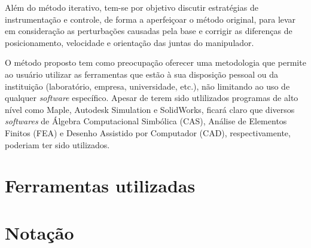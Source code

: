 Além do método iterativo, tem-se por objetivo discutir estratégias de
instrumentação e controle, de forma a aperfeiçoar o método original, para levar
em consideração as perturbações causadas pela base e corrigir as diferenças de
posicionamento, velocidade e orientação das juntas do manipulador.

O método proposto tem como preocupação oferecer uma metodologia que permite ao
usuário utilizar as ferramentas que estão à sua disposição pessoal ou da
instituição (laboratório, empresa, universidade, etc.), não limitando ao uso de
qualquer \textit{software} específico. Apesar de terem sido utlilizados
programas de alto nível como Maple, Autodesk Simulation e SolidWorks, ficará
claro que diversos \textit{softwares} de Álgebra Computacional Simbólica (CAS),
Análise de Elementos Finitos (FEA) e Desenho Assistido por Computador (CAD),
respectivamente, poderiam ter sido utilizados.


\section{Ferramentas utilizadas}

\section{Notação}
